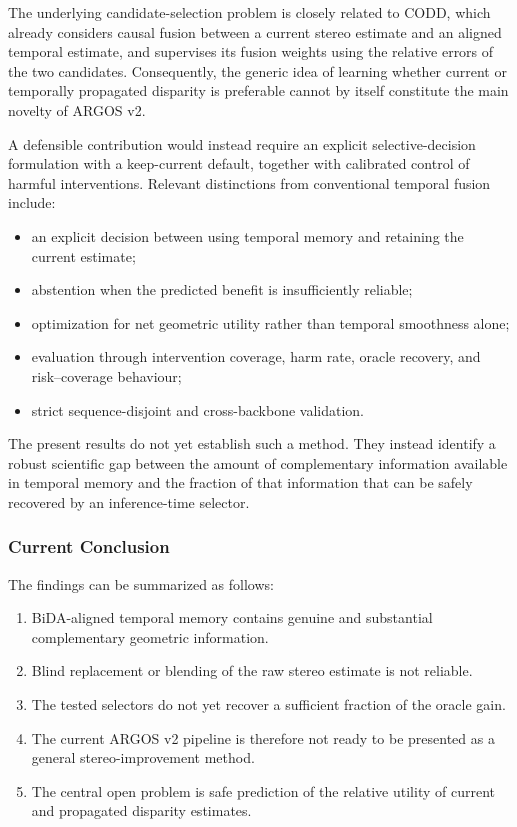 \documentclass[11pt,a4paper]{article}
\begin{document}
The underlying candidate-selection problem is closely related to CODD, which already considers causal fusion between a current stereo estimate and an aligned temporal estimate, and supervises its fusion weights using the relative errors of the two candidates. Consequently, the generic idea of learning whether current or temporally propagated disparity is preferable cannot by itself constitute the main novelty of ARGOS v2.

A defensible contribution would instead require an explicit selective-decision formulation with a keep-current default, together with calibrated control of harmful interventions. Relevant distinctions from conventional temporal fusion include:
\begin{itemize}
    \item an explicit decision between using temporal memory and retaining the current estimate;
    \item abstention when the predicted benefit is insufficiently reliable;
    \item optimization for net geometric utility rather than temporal smoothness alone;
    \item evaluation through intervention coverage, harm rate, oracle recovery, and risk--coverage behaviour;
    \item strict sequence-disjoint and cross-backbone validation.
\end{itemize}

The present results do not yet establish such a method. They instead identify a robust scientific gap between the amount of complementary information available in temporal memory and the fraction of that information that can be safely recovered by an inference-time selector.

\subsubsection{Current Conclusion}

The findings can be summarized as follows:
\begin{enumerate}
    \item BiDA-aligned temporal memory contains genuine and substantial complementary geometric information.
    \item Blind replacement or blending of the raw stereo estimate is not reliable.
    \item The tested selectors do not yet recover a sufficient fraction of the oracle gain.
    \item The current ARGOS v2 pipeline is therefore not ready to be presented as a general stereo-improvement method.
    \item The central open problem is safe prediction of the relative utility of current and propagated disparity estimates.
\end{enumerate}
\end{document}
